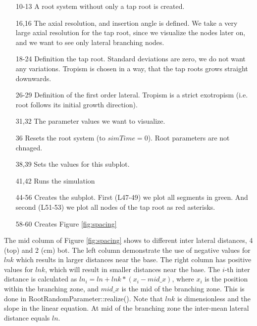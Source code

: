 

\begin{itemize}
\item[10-13] A root system without only a tap root is created. 
\item[16,16] The axial resolution, and insertion angle is defined. We take a very large axial resolution for the tap root, since we visualize the nodes later on, and we want to see only lateral branching nodes.
\item[18-24] Definition the tap root. Standard deviations are zero, we do not want any variations. Tropism is chosen in a way, that the tap roots grows straight downwards.
\item[26-29] Definition of the first order lateral. Tropism is a strict exotropism (i.e. root follows its initial growth direction).
\item[31,32] The parameter values we want to visualize.
\item[36] Resets the root system (to $simTime = 0$). Root parameters are not chnaged. 
\item[38,39] Sets the values for this subplot. 
\item[41,42] Runs the simulation
\item[44-56] Creates the subplot. First (L47-49) we plot all segments in green. And second (L51-53) we plot all nodes of the tap root as red asterisks.
\item[58-60] Creates Figure \ref{fig:spacing}
\end{itemize}

The mid column of Figure \ref{fig:spacing} shows to different inter lateral distances, 4 (top) and 2 (cm) bot. The left column demonstrate the use of negative values for $lnk$ which results in larger distances near the base. The right column has positive values for $lnk$, which will result in smaller distances near the base. The $i$-th inter distance is calculated as $ln_i = ln + lnk*(x_i-mid\_x)$, where $x_i$ is the position within the branching zone, and $mid\_x$ is the mid of the branching zone. This is done in RootRandomParameter::realize(). Note that $lnk$ is dimensionless and the slope in the linear equation. At mid of the branching zone the inter-mean lateral distance equals $ln$. 

